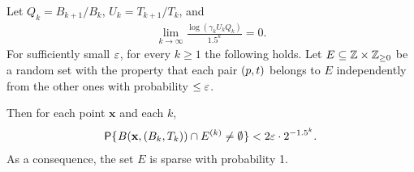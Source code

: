\documentclass[11pt]{memoir}
\theoremstyle{definition} %
\renewcommand{\le}{\leq}
\renewcommand{\ge}{\geq}
\renewcommand{\vek}[1]{\mathbf{#1}}
\def\B{B}
\def\U{U}
\newcommand{\Q}{Q}
\newcommand{\Tu}{T}
\begin{document}
\begin{lemma}[Sparsity]\label{lem:sparsiness}
Let \( \Q_{k} = \B_{k+1}/\B_{k} \), \( \U_{k} = \Tu_{k+1}/\Tu_{k} \), and
\begin{align}\label{eq:growth-assumption}
  \lim_{k\rightarrow\infty}\frac{\log(\gamma_{k}\U_{k} \Q_{k})}{1.5^k}=0.
\end{align}
For sufficiently small \( \varepsilon \), for every \( k\ge 1 \) the following holds.
Let \( E\subseteq \bbZ\times \bbZ_{\ge 0} \)
be a random set with the property that each pair \( (p,t) \) belongs to \( E \)
independently from the other ones with probability \( \le \eps \).

Then for each point \( \vek{x} \)  and each \( k \),
 \begin{align*}
   \Pbof{B(\vek{x},(\B_{k}, \Tu_{k}))\cap E^{(k)}\neq\emptyset} <2\eps \cdot 2^{-1.5^{k}}.
 \end{align*}
As a consequence, the set \( E \) is sparse with probability 1.
\end{lemma}
\end{document}
